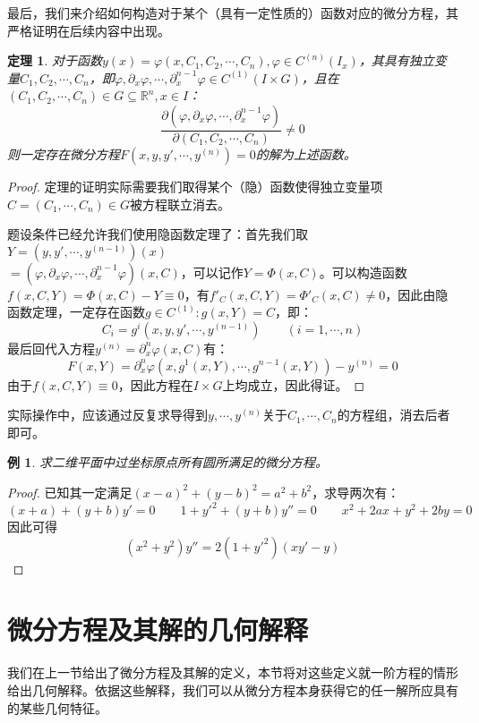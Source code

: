 \documentclass[UTF8]{book}
\newcommand{\R}{\mathbb{R}}
\newtheorem{theorem}{定理}
\newtheorem{example}{例}
\begin{document}
    \vspace{1cm}最后，我们来介绍如何构造对于某个（具有一定性质的）函数对应的微分方程，其严格证明在后续内容中出现。
    \begin{theorem}
        对于函数$ y(x)=\varphi(x,C_1,C_2,\cdots,C_n),\varphi\in C^{(n)}(I_x)$，其具有独立变量$ C_1,C_2,\cdots,C_n $，即$ \varphi,\partial_x \varphi,\cdots,\partial^{n-1}_x \varphi\in C^{(1)}(I\times G) $，且在$ (C_1,C_2,\cdots,C_n)\in G\subseteq \R^n,x\in I $：$$ \frac{\partial(\varphi,\partial_x \varphi,\cdots,\partial^{n-1}_x \varphi)}{\partial(C_1,C_2,\cdots,C_n)}\neq 0 $$
        则一定存在微分方程$ F(x,y,y',\cdots,y^{(n)})=0 $的解为上述函数。
    \end{theorem}
    \begin{proof}
        定理的证明实际需要我们取得某个（隐）函数使得独立变量项$ C=(C_1,\cdots,C_n)\in G $被方程联立消去。
        
        题设条件已经允许我们使用隐函数定理了：首先我们取$ Y=(y,y',\cdots,y^{(n-1)})(x)$ \\  $=(\varphi,\partial_x \varphi,\cdots,\partial^{n-1}_x \varphi)(x,C) $，可以记作$ Y=\varPhi(x,C) $。可以构造函数$ f(x,C,Y)=\varPhi(x,C)-Y\equiv 0 $，有$ f'_C(x,C,Y)=\varPhi'_C(x,C)\neq 0 $，因此由隐函数定理，一定存在函数$ g\in C^{(1)}:g(x,Y)=C $，即：$$ C_i=g^i(x,y,y',\cdots,y^{(n-1)})\qquad (i=1,\cdots,n) $$
        最后回代入方程$ y^{(n)}=\partial^n_x\varphi(x,C) $有：$$ F(x,Y)=\partial^n_x\varphi(x,g^1(x,Y),\cdots,g^{n-1}(x,Y))-y^{(n)}=0 $$
        由于$ f(x,C,Y)\equiv 0 $，因此方程在$ I\times G $上均成立，因此得证。
    \end{proof}
    实际操作中，应该通过反复求导得到$ y,\cdots,y^{(n)} $关于$ C_1,\cdots,C_n $的方程组，消去后者即可。
    \begin{example}
        求二维平面中过坐标原点所有圆所满足的微分方程。
    \end{example}\begin{proof}
        已知其一定满足$ (x-a)^2+(y-b)^2=a^2+b^2 $，求导两次有：$$ (x+a)+(y+b)y'=0\qquad 1+y'^2+(y+b)y''=0\qquad x^2+2ax+y^2+2by=0$$
        因此可得$$ (x^2+y^2)y''=2(1+y'^2)(xy'-y) $$
    \end{proof}
    \section{微分方程及其解的几何解释}
    我们在上一节给出了微分方程及其解的定义，本节将对这些定义就一阶方程的情形给出几何解释。依据这些解释，我们可以从微分方程本身获得它的任一解所应具有的某些几何特征。
\end{document}
